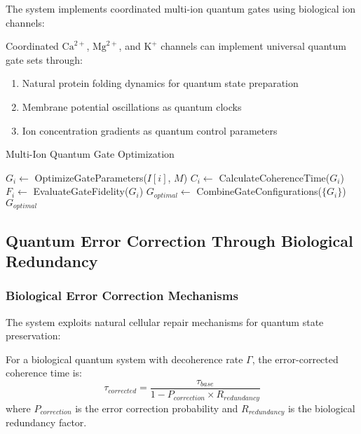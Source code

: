 \documentclass[11pt,a4paper]{article}
\begin{document}
The system implements coordinated multi-ion quantum gates using biological ion channels:

\begin{theorem}
Coordinated $\text{Ca}^{2+}$, $\text{Mg}^{2+}$, and $\text{K}^+$ channels can implement universal quantum gate sets through:
\begin{enumerate}
\item Natural protein folding dynamics for quantum state preparation
\item Membrane potential oscillations as quantum clocks
\item Ion concentration gradients as quantum control parameters
\end{enumerate}
\end{theorem}

\begin{algorithm}
\caption{Multi-Ion Quantum Gate Optimization}
\begin{algorithmic}
        \State $G_i \leftarrow$ OptimizeGateParameters($I[i]$, $M$)
        \State $C_i \leftarrow$ CalculateCoherenceTime($G_i$)
        \State $F_i \leftarrow$ EvaluateGateFidelity($G_i$)
    \EndFor
    \State $G_{optimal} \leftarrow$ CombineGateConfigurations($\{G_i\}$)
    \State \Return $G_{optimal}$
\EndProcedure
\end{algorithmic}
\end{algorithm}

\subsection{Quantum Error Correction Through Biological Redundancy}

\subsubsection{Biological Error Correction Mechanisms}

The system exploits natural cellular repair mechanisms for quantum state preservation:

\begin{definition}
For a biological quantum system with decoherence rate $\Gamma$, the error-corrected coherence time is:
\begin{equation}
\tau_{corrected} = \frac{\tau_{base}}{1 - P_{correction} \times R_{redundancy}}
\end{equation}
where $P_{correction}$ is the error correction probability and $R_{redundancy}$ is the biological redundancy factor.
\end{definition}
\end{document}
